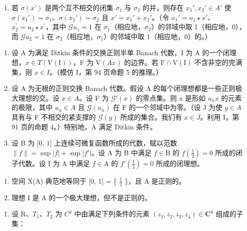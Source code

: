 \begin{enumerate}
\def\labelenumi{\alph{enumi})}
\setcounter{enumi}{7}
\tightlist
\item
  若 \(\sigma(x')\) 是两个互不相交的闭集 \(\sigma_1\) 与 \(\sigma_2\) 的并，则存在 \(x_1', x_2' \in A'\) 使 \(\sigma(x_1') = \sigma_1\)、\(\sigma(x_2') = \sigma_2\) 且 \(x' = x_1' + x_2'\)。（令 \(x_1' = u_1 \star x'\)、\(x_{2}^{\prime}=u_{2}\star x^{\prime}\)，其中 \(\mathcal{G}u_{1}=1\) 在 \(\sigma_{1}\)（相应地，\(\sigma_{2}\)）的邻域中取 1（相应地，0），而 \(\mathcal{G}u_{2}=1\) 在 \(\sigma_{2}\)（相应地，\(\sigma_{1}\)）的邻域中取 1（相应地，0）的。）
\end{enumerate}

\begin{enumerate}
\def\labelenumi{\arabic{enumi})}
\setcounter{enumi}{3}
\item
  设 A 为满足 Ditkin 条件的交换正则半单 Banach 代数，I 为 A 的一个闭理想，\(x \in \Upsilon(\mathrm{V}(\mathrm{I}))\)，F 为 \(\mathrm{V}(Ax)\) 的边界。若 \(\mathrm{F} \cap \mathrm{V}(\mathrm{I})\) 不含非空的完满集，则 \(x \in I\)。（模仿 I，第 94 页命题 5 的推理。）
\item
  设 A 为无根的正则交换 Banach 代数。假设 A 的每个闭理想都是一些正则极大理想的交。设 \(x \in A\)。设 F 为 \(\mathcal{G}'(x)\) 的零点集。则 x 是形如 \(u_{n}x\) 的元素的极限，其中 \(u_{n} \in A\) 且 \(\mathcal{G}(u_{n})\) 在 F 的一个邻域中为零。（设 J 为使 \(y \in A\) 具有与 F 不相交的紧支撑的 \(\mathcal{G}(y)\) 所成的集合。我们有 \(x \in \overline{J}\)。利用 I，第 91 页的命题 4。）特别地，A 满足 Ditkin 条件。
\item
  设 B 为 {[}0, 1{]} 上连续可微复函数所成的代数，赋以范数 \(\|f\| = \sup |f| + \sup |f'|\)。设 A 为 B 中满足 \(f \in \mathrm{B}\) 的 \(f\left(\frac{1}{2}\right) = 0\) 所成的闭子代数。设 I 为 A 中满足 \(f \in \mathrm{A}\) 的 \(f'\left(\frac{1}{2}\right) = 0\) 所成的闭理想。
\end{enumerate}

\begin{enumerate}
\def\labelenumi{\alph{enumi})}
\item
  空间 X(A) 典范地等同于 {[}0, 1{]} = \{ \(\frac{1}{2}\) \}，且 A 是正则的。
\item
  理想 I 是 A 的一个极大理想，但不是正则的。
\end{enumerate}

\begin{enumerate}
\def\labelenumi{\arabic{enumi})}
\setcounter{enumi}{6}
\tightlist
\item
  设 R、\(T_{1}\)、\(T_{2}\) 为 \(C^{4}\) 中由满足下列条件的元素 \((z_{1}, z_{2}, z_{3}, z_{4}) \in \mathbf{C}^{4}\) 组成的子集：
\end{enumerate}

